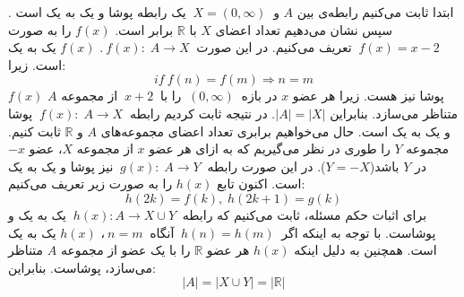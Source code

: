 \p
ابتدا ثابت می‌کنیم رابطه‌ی بین $A$ و 
$\:X = (0, \infty)\:$ یک رابطه پوشا و یک به یک است . سپس نشان می‌دهیم تعداد اعضای
 $X$
 با
 $\mathbb{R}$
 برابر است.
\p
		$f(x)$
		را به صورت
		$\: f(x) = x - 2 \:$
		تعریف می‌کنیم.
		در این صورت 
		$\: f(x):\; A \rightarrow X \:$. 
		$f(x)$
	     یک به یک است. زیرا:
		  $$if \: f(n) = f(m) \Rightarrow n = m$$
 		$f(x)$
		پوشا نیز هست. زیرا هر عضو
		$x$  
		در بازه
		 $\:(0, \infty)\:$	
		 را 	
		با
		$\:x + 2\:$
		از مجموعه
		 $A$
		متناظر می‌سازد.
 		بنابراین $|A| = |X|$.
		در نتیجه ثابت کردیم رابطه
		$\:f(x):\; A \rightarrow X\:$
		 پوشا و یک به یک است.
		 \p
 		حال می‌خواهیم برابری تعداد اعضای مجموعه‌های $A$ و $\mathbb{R}$ ثابت کنیم.
 	    مجموعه
		 $Y$
		 را طوری در نظر می‌گیریم که
	    به ازای هر عضو 
		$x$ 
		از مجموعه 
		$X$، 
		عضو 
		$-x$ 
		در  
		$Y$
		باشد($Y = -X$).
		در این صورت
		رابطه
		$\:g(x):\; A \rightarrow Y\:$
		نیز پوشا و یک به یک است.
		اکنون
 		تابع 
		 $h(x)$
		را به صورت زیر تعریف می‌کنیم: 
		$$h(2k) = f(k),\; h(2k+1) = g(k)$$
		برای اثبات  حکم مسئله،
		 ثابت می‌کنیم که رابطه 
		 $\:h(x): A \rightarrow X \cup Y\:$
	    یک به یک و پوشاست.
		با توجه به اینکه
        اگر 
        $\:h(n) = h(m)\:$
        آنگاه
		$\:n = m\:$،
		$h(x)$
		یک به یک است.
		همچنین به دلیل اینکه
		$h(x)$
		هر عضو 
		$\mathbb{R}$	
		 را 	
		با
		یک عضو
		از مجموعه
		 $A$
		متناظر می‌سازد، پوشاست.
		بنابراین:
		$$|A| = |X \cup Y| = |\mathbb{R}|$$
 		
 			